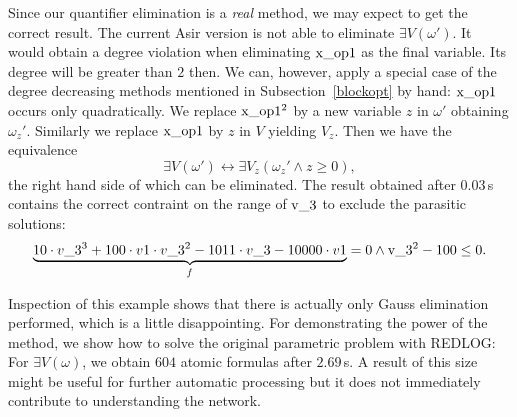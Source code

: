 Since our quantifier elimination is a {\em real} method, we may expect
to get the correct result. The current Asir version is not able to
eliminate $\exists V(\omega')$. It would obtain a degree violation
when eliminating $\rm x\_op1$ as the final variable. Its degree will
be greater than $2$ then. We can, however, apply a special case of the
degree decreasing methods mentioned in Subsection~\ref{blockopt} by
hand: $\rm x\_op1$ occurs only quadratically. We replace $\rm
x\_op1^2$ by a new variable $z$ in $\omega'$ obtaining $\omega_z'$. 
Similarly we replace $\rm x\_op1$ by $z$ in $V$ yielding $V_z$. Then
we have the equivalence
$$
\exists V(\omega')\longleftrightarrow\exists V_z(\omega_z'\land
z\geq0),
$$
the right hand side of which can be eliminated. The result obtained
after $0.03$\,s contains the correct contraint on the range of $\rm
v\_3$ to exclude the parasitic solutions:
$$\rm \underbrace{10\cdot v\_3^3+100\cdot v1\cdot v\_3^2-1011\cdot
v\_3-10000\cdot v1}_{\mathit f}=0 \land v\_3^2-100 \leq 0.
$$

Inspection of this example shows that there is actually only Gauss
elimination performed, which is a little disappointing. For
demonstrating the power of the method, we show how to solve the
original parametric problem with REDLOG: For $\exists V(\omega)$, we
obtain $604$ atomic formulas after $2.69$\,s. A result of this size
might be useful for further automatic processing but it does not
immediately contribute to understanding the network.

